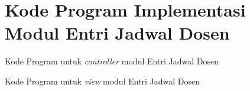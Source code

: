 \chapter{Kode Program Implementasi Modul Entri Jadwal Dosen}
\label{Implementasi Modul Entri Jadwal Dosen}

%
%
%

Kode Program untuk \textit{controller} modul Entri Jadwal Dosen
 

Kode Program untuk \textit{view} modul Entri Jadwal Dosen
 
